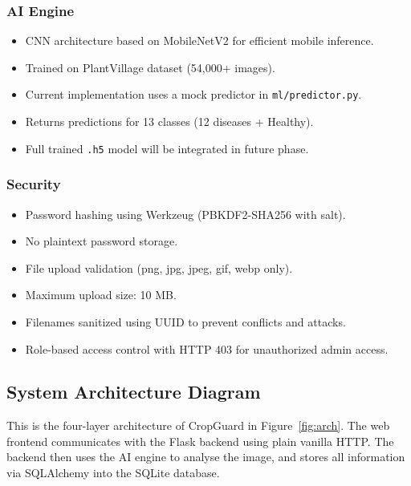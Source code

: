 \documentclass[12pt,a4paper]{article}
\begin{document}
\subsubsection*{AI Engine}

\begin{itemize}[leftmargin=2em]
  \item CNN architecture based on MobileNetV2 for efficient mobile inference.
  \item Trained on PlantVillage dataset (54,000+ images).
  \item Current implementation uses a mock predictor in \texttt{ml/predictor.py}.
  \item Returns predictions for 13 classes (12 diseases + Healthy).
  \item Full trained \texttt{.h5} model will be integrated in future phase.
\end{itemize}

\subsubsection*{Security}

\begin{itemize}[leftmargin=2em]
  \item Password hashing using Werkzeug (PBKDF2-SHA256 with salt).
  \item No plaintext password storage.
  \item File upload validation (png, jpg, jpeg, gif, webp only).
  \item Maximum upload size: 10 MB.
  \item Filenames sanitized using UUID to prevent conflicts and attacks.
  \item Role-based access control with HTTP 403 for unauthorized admin access.
\end{itemize}

\subsection{System Architecture Diagram}

This is the four-layer architecture of CropGuard in Figure~\ref{fig:arch}. The web frontend communicates with the Flask backend using plain vanilla HTTP. The backend then uses the AI engine to analyse the image, and stores all information via SQLAlchemy into the SQLite database.
\end{document}
